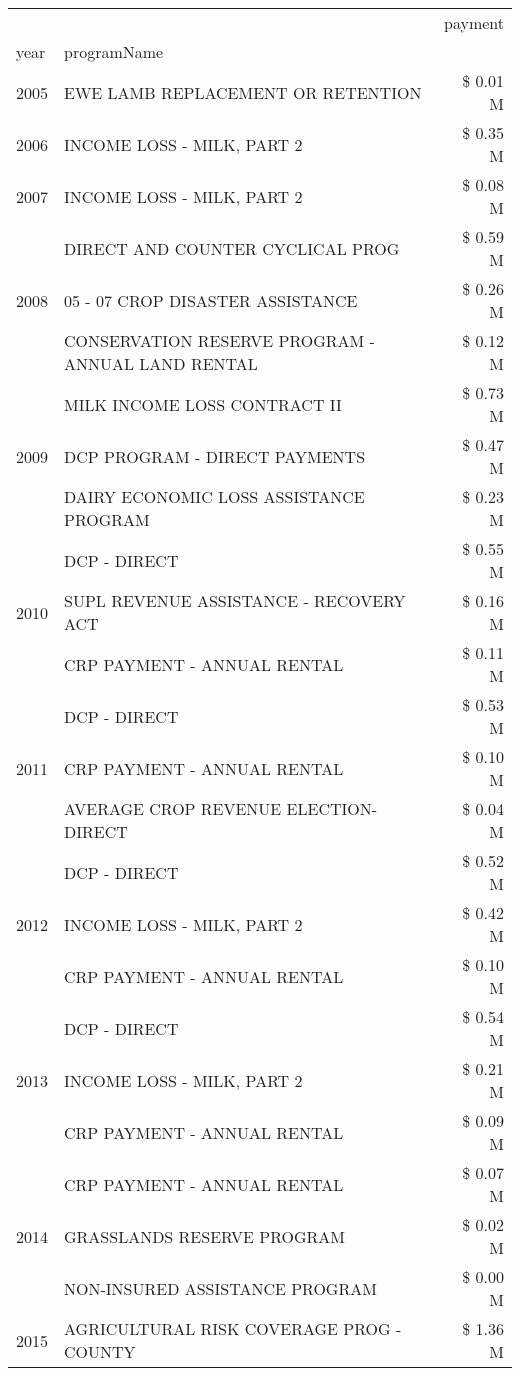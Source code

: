 \begin{tabular}{llr}
\toprule
 &  & payment \\
year & programName &  \\
\midrule
2005 & EWE LAMB REPLACEMENT OR RETENTION & \$ 0.01 M \\
\cline{1-3}
2006 & INCOME LOSS - MILK, PART 2 & \$ 0.35 M \\
\cline{1-3}
2007 & INCOME LOSS - MILK, PART 2 & \$ 0.08 M \\
\cline{1-3}
\multirow[t]{3}{*}{2008} & DIRECT AND COUNTER CYCLICAL PROG & \$ 0.59 M \\
 & 05 - 07 CROP DISASTER ASSISTANCE & \$ 0.26 M \\
 & CONSERVATION RESERVE PROGRAM - ANNUAL LAND RENTAL & \$ 0.12 M \\
\cline{1-3}
\multirow[t]{3}{*}{2009} & MILK INCOME LOSS CONTRACT II & \$ 0.73 M \\
 & DCP PROGRAM - DIRECT PAYMENTS & \$ 0.47 M \\
 & DAIRY ECONOMIC LOSS ASSISTANCE PROGRAM & \$ 0.23 M \\
\cline{1-3}
\multirow[t]{3}{*}{2010} & DCP - DIRECT & \$ 0.55 M \\
 & SUPL REVENUE ASSISTANCE - RECOVERY ACT & \$ 0.16 M \\
 & CRP PAYMENT - ANNUAL RENTAL & \$ 0.11 M \\
\cline{1-3}
\multirow[t]{3}{*}{2011} & DCP - DIRECT & \$ 0.53 M \\
 & CRP PAYMENT - ANNUAL RENTAL & \$ 0.10 M \\
 & AVERAGE CROP REVENUE ELECTION-DIRECT & \$ 0.04 M \\
\cline{1-3}
\multirow[t]{3}{*}{2012} & DCP - DIRECT & \$ 0.52 M \\
 & INCOME LOSS - MILK, PART 2 & \$ 0.42 M \\
 & CRP PAYMENT - ANNUAL RENTAL & \$ 0.10 M \\
\cline{1-3}
\multirow[t]{3}{*}{2013} & DCP - DIRECT & \$ 0.54 M \\
 & INCOME LOSS - MILK, PART 2 & \$ 0.21 M \\
 & CRP PAYMENT - ANNUAL RENTAL & \$ 0.09 M \\
\cline{1-3}
\multirow[t]{3}{*}{2014} & CRP PAYMENT - ANNUAL RENTAL & \$ 0.07 M \\
 & GRASSLANDS RESERVE PROGRAM & \$ 0.02 M \\
 & NON-INSURED ASSISTANCE PROGRAM & \$ 0.00 M \\
\cline{1-3}
\multirow[t]{3}{*}{2015} & AGRICULTURAL RISK COVERAGE PROG - COUNTY & \$ 1.36 M \\

\end{tabular}
